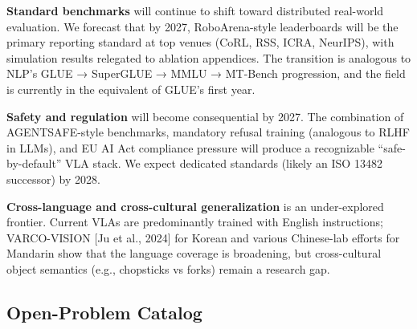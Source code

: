 \textbf{Standard benchmarks} will continue to shift toward distributed real-world evaluation. We forecast that by 2027, RoboArena-style leaderboards will be the primary reporting standard at top venues (CoRL, RSS, ICRA, NeurIPS), with simulation results relegated to ablation appendices. The transition is analogous to NLP's GLUE → SuperGLUE → MMLU → MT-Bench progression, and the field is currently in the equivalent of GLUE's first year.

\textbf{Safety and regulation} will become consequential by 2027. The combination of AGENTSAFE-style benchmarks, mandatory refusal training (analogous to RLHF in LLMs), and EU AI Act compliance pressure will produce a recognizable ``safe-by-default'' VLA stack. We expect dedicated standards (likely an ISO 13482 successor) by 2028.

\textbf{Cross-language and cross-cultural generalization} is an under-explored frontier. Current VLAs are predominantly trained with English instructions; VARCO-VISION {[}Ju et al., 2024{]} for Korean and various Chinese-lab efforts for Mandarin show that the language coverage is broadening, but cross-cultural object semantics (e.g., chopsticks vs forks) remain a research gap.

\subsection{Open-Problem Catalog}\label{open-problem-catalog}

